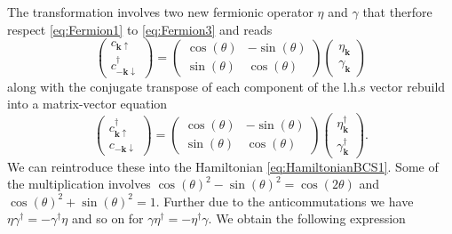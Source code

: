 \documentclass[../main.tex]{subfile}
\begin{document}
The transformation involves two new fermionic operator $\eta$ and $\gamma$ that therfore respect \ref{eq:Fermion1} to \ref{eq:Fermion3} and reads
\begin{equation*}
    \begin{pmatrix}
        c_{\bm{k}\uparrow}\\
        c_{-\bm{k}\downarrow}^{\dagger}
    \end{pmatrix} = 
    \begin{pmatrix}
        \cos(\theta) & -\sin(\theta)\\
        \sin(\theta) & \cos(\theta)
    \end{pmatrix}
    \begin{pmatrix}
        \eta_{\bm{k}}\\
        \gamma_{\bm{k}}
    \end{pmatrix}
\end{equation*}
along with the conjugate transpose of each component of the l.h.s vector rebuild into a matrix-vector equation
\begin{equation*}
    \begin{pmatrix}
        c_{\bm{k}\uparrow}^{\dagger} \\
        c_{-\bm{k}\downarrow}
    \end{pmatrix} = 
    \begin{pmatrix}
        \cos(\theta) & -\sin(\theta)\\
        \sin(\theta) & \cos(\theta)
    \end{pmatrix}
    \begin{pmatrix}
        \eta_{\bm{k}}^{\dagger} \\
        \gamma_{\bm{k}}^{\dagger}
    \end{pmatrix}.
\end{equation*}
We can reintroduce these into the Hamiltonian \ref{eq:HamiltonianBCS1}. 
Some of the multiplication involves $\cos(\theta)^2 - \sin(\theta)^2 = \cos(2\theta)$ and $\cos(\theta)^2 + \sin(\theta)^2 = 1$. 
Further due to the anticommutations we have $\eta \gamma^{\dagger} = - \gamma^{\dagger}\eta$ and so on for $\gamma \eta^{\dagger} = - \eta^{\dagger}\gamma$.
We obtain the following expression
\end{document}
